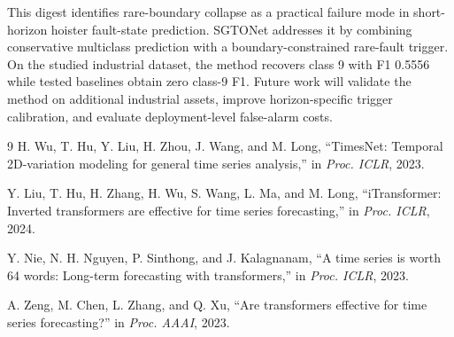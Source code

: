 \documentclass[12pt,letterpaper]{article}
\begin{document}
This digest identifies rare-boundary collapse as a practical failure mode in short-horizon hoister fault-state prediction. SGTONet addresses it by combining conservative multiclass prediction with a boundary-constrained rare-fault trigger. On the studied industrial dataset, the method recovers class 9 with F1 0.5556 while tested baselines obtain zero class-9 F1. Future work will validate the method on additional industrial assets, improve horizon-specific trigger calibration, and evaluate deployment-level false-alarm costs.

\begin{thebibliography}{9}
H. Wu, T. Hu, Y. Liu, H. Zhou, J. Wang, and M. Long, ``TimesNet: Temporal 2D-variation modeling for general time series analysis,'' in \emph{Proc. ICLR}, 2023.

Y. Liu, T. Hu, H. Zhang, H. Wu, S. Wang, L. Ma, and M. Long, ``iTransformer: Inverted transformers are effective for time series forecasting,'' in \emph{Proc. ICLR}, 2024.

Y. Nie, N. H. Nguyen, P. Sinthong, and J. Kalagnanam, ``A time series is worth 64 words: Long-term forecasting with transformers,'' in \emph{Proc. ICLR}, 2023.

A. Zeng, M. Chen, L. Zhang, and Q. Xu, ``Are transformers effective for time series forecasting?'' in \emph{Proc. AAAI}, 2023.
\end{thebibliography}
\end{document}
